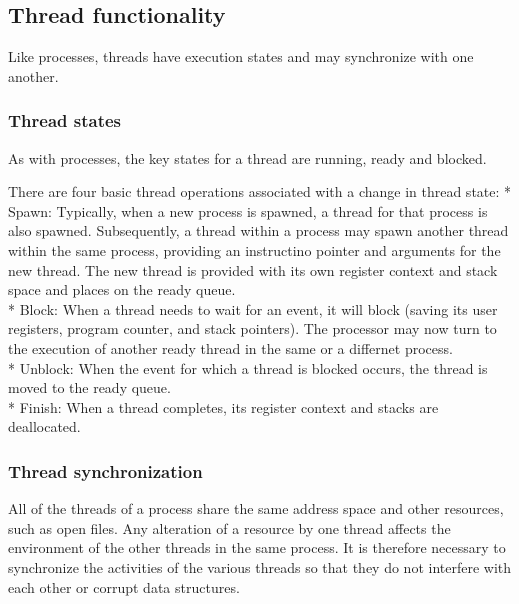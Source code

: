 \subsection{Thread functionality}

Like processes, threads have execution states and may synchronize with one another. 

\subsubsection{Thread states}

As with processes, the key states for a thread are running, ready and blocked. 

There are four basic thread operations associated with a change in thread state:
* Spawn: Typically, when a new process is spawned, a thread for that process is also spawned. Subsequently, a thread within a process may spawn another thread within the same process, providing an instructino pointer and arguments for the new thread. The new thread is provided with its own register context and stack space and places on the ready queue.\\
* Block: When a thread needs to wait for an event, it will block (saving its user registers, program counter, and stack pointers). The processor may now turn to the execution of another ready thread in the same or a differnet process.\\
* Unblock: When the event for which a thread is blocked occurs, the thread is moved to the ready queue.\\
* Finish: When a thread completes, its register context and stacks are deallocated.\\

\subsubsection{Thread synchronization}

All of the threads of a process share the same address space and other resources, such as open files. Any alteration of a resource by one thread affects the environment of the other threads in the same process. It is therefore necessary to synchronize the activities of the various threads so that they do not interfere with each other or corrupt data structures.